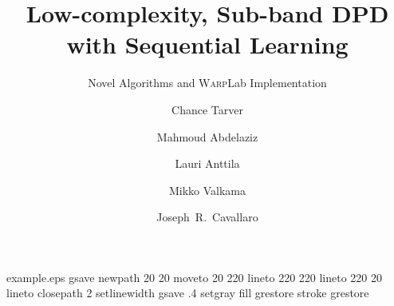 %
%
%
%
%
\begin{filecontents*}{example.eps}
gsave
newpath
  20 20 moveto
  20 220 lineto
  220 220 lineto
  220 20 lineto
closepath
2 setlinewidth
gsave
  .4 setgray fill
grestore
stroke
grestore
\end{filecontents*}
%
\RequirePackage{fix-cm}
%
\documentclass[twocolumn]{svjour3}          %
%
\smartqed  %
%
\usepackage{amsmath,graphicx}
\usepackage{import}
\usepackage[ruled]{algorithm2e}
%
%
%
%
%


\title{Low-complexity, Sub-band DPD with Sequential Learning%
}
\subtitle{Novel Algorithms and \textsc{Warp}Lab Implementation}


\author{Chance Tarver         \and
        Mahmoud Abdelaziz \and
        Lauri Anttila \and
        Mikko Valkama \and
        Joseph~R.~Cavallaro
}


